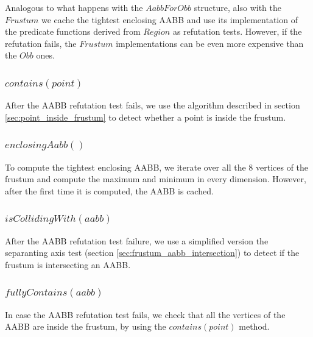 \documentclass{PoliMi_MasterThesis}
\begin{document}
Analogous to what happens with the $AabbForObb$ structure, also with the $Frustum$ we cache the tightest enclosing AABB and use its implementation of the predicate functions derived from $Region$ as refutation tests. However, if the refutation fails, the $Frustum$ implementations can be even more expensive than the $Obb$ ones.

\subsubsection*{$contains(point)$}
After the AABB refutation test fails, we use the algorithm described in section \ref{sec:point_inside_frustum} to detect whether a point is inside the frustum.

\subsubsection*{$enclosingAabb()$}
To compute the tightest enclosing AABB, we iterate over all the 8 vertices of the frustum and compute the maximum and minimum in every dimension. However, after the first time it is computed, the AABB is cached.

\subsubsection*{$isCollidingWith(aabb)$}
After the AABB refutation test failure, we use a simplified version the separanting axis test (section \ref{sec:frustum_aabb_intersection}) to detect if the frustum is intersecting an AABB.

\subsubsection*{$fullyContains(aabb)$}
In case the AABB refutation test fails, we check that all the vertices of the AABB are inside the frustum, by using the $contains(point)$ method.
\end{document}
